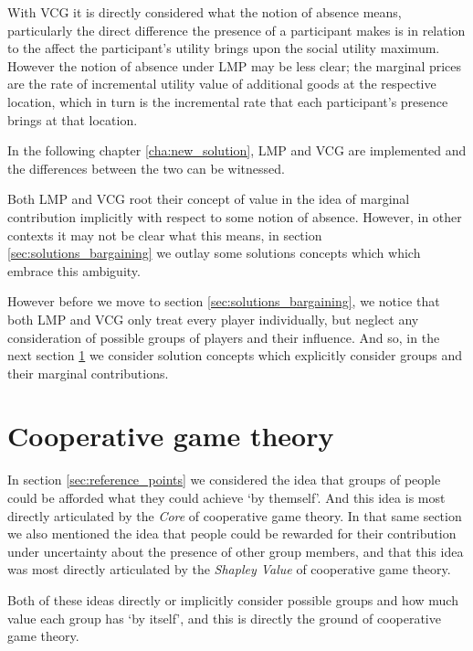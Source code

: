 With VCG it is directly considered what the notion of absence means, particularly the direct difference the presence of a participant makes is in relation to the affect the participant's utility brings upon the social utility maximum.
However the notion of absence under LMP may be less clear; the marginal prices are the rate of incremental utility value of additional goods at the respective location, which in turn is the incremental rate that each participant's presence brings at that location.

In the following chapter \ref{cha:new_solution}, LMP and VCG are implemented and the differences between the two can be witnessed.

Both LMP and VCG root their concept of value in the idea of marginal contribution implicitly with respect to some notion of absence. However, in other contexts it may not be clear what this means, in section \ref{sec:solutions_bargaining} we outlay some solutions concepts which which embrace this ambiguity.

However before we move to section \ref{sec:solutions_bargaining}, we notice that both LMP and VCG only treat every player individually, but neglect any consideration of possible groups of players and their influence.
And so, in the next section \ref{sec:cooperative_game_theory_part} we consider solution concepts which explicitly consider groups and their marginal contributions.



\section{Cooperative game theory}\label{sec:cooperative_game_theory_part}

In section \ref{sec:reference_points} we considered the idea that groups of people could be afforded what they could achieve `by themself'.
And this idea is most directly articulated by the \textit{Core} of cooperative game theory.
In that same section we also mentioned the idea that people could be rewarded for their contribution under uncertainty about the presence of other group members, and that this idea was most directly articulated by the \textit{Shapley Value} of cooperative game theory.

Both of these ideas directly or implicitly consider possible groups and how much value each group has `by itself', and this is directly the ground of cooperative game theory.

